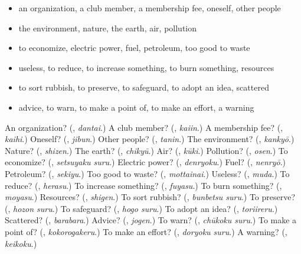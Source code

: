 \begin{itemize}
\raggedright
  \item an organization, a club member, a membership fee, oneself, other people
  \item the environment, nature, the earth, air, pollution
  \item to economize, electric power, fuel, petroleum, too good to waste
  \item useless, to reduce, to increase something, to burn something, resources
  \item to sort rubbish, to preserve, to safeguard, to adopt an idea, scattered
  \item advice, to warn, to make a point of, to make an effort, a warning
\end{itemize}

\begin{tcolorbox}[breakable,colback=teal!4,colframe=teal!35!black,title={Before you move on}]
An organization? (\textbf{}, \emph{dantai}.) A club member? (\textbf{}, \emph{kaiin}.) A membership fee? (\textbf{}, \emph{kaihi}.) Oneself? (\textbf{}, \emph{jibun}.) Other people? (\textbf{}, \emph{tanin}.) The environment? (\textbf{}, \emph{kankyō}.) Nature? (\textbf{}, \emph{shizen}.) The earth? (\textbf{}, \emph{chikyū}.) Air? (\textbf{}, \emph{kūki}.) Pollution? (\textbf{}, \emph{osen}.) To economize? (\textbf{}, \emph{setsuyaku suru}.) Electric power? (\textbf{}, \emph{denryoku}.) Fuel? (\textbf{}, \emph{nenryō}.) Petroleum? (\textbf{}, \emph{sekiyu}.) Too good to waste? (\textbf{}, \emph{mottainai}.) Useless? (\textbf{}, \emph{muda}.) To reduce? (\textbf{}, \emph{herasu}.) To increase something? (\textbf{}, \emph{fuyasu}.) To burn something? (\textbf{}, \emph{moyasu}.) Resources? (\textbf{}, \emph{shigen}.) To sort rubbish? (\textbf{}, \emph{bunbetsu suru}.) To preserve? (\textbf{}, \emph{hozon suru}.) To safeguard? (\textbf{}, \emph{hogo suru}.) To adopt an idea? (\textbf{}, \emph{toriireru}.) Scattered? (\textbf{}, \emph{barabara}.) Advice? (\textbf{}, \emph{jogen}.) To warn? (\textbf{}, \emph{chūkoku suru}.) To make a point of? (\textbf{}, \emph{kokorogakeru}.) To make an effort? (\textbf{}, \emph{doryoku suru}.) A warning? (\textbf{}, \emph{keikoku}.)
\end{tcolorbox}
